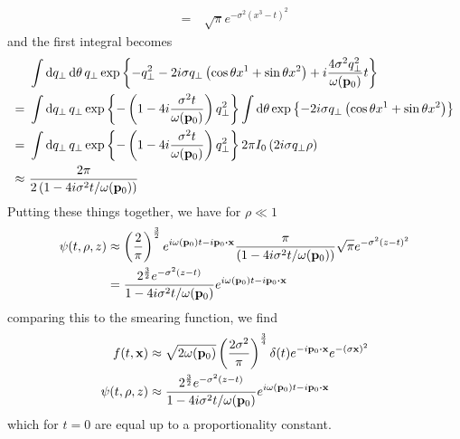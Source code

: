 \begin{example}
\begin{equation*}
\begin{split}
			\\
			=&\
			\sqrt{\pi}
			e^{-\sigma^2(x^3-t)^2}
		\end{split}
	\end{equation*}
	and the first integral becomes
	\begin{equation*}
		\begin{split}
			&\
			\int\dd{q_\perp}\dd{\theta} q_\perp
			\exp\left\{
				-
				q_\perp^2
				-
				2i\sigma
				q_\perp
				\left(
					\cos\theta
					x^1
					+
					\sin\theta
					x^2
				\right)
				+
				i\frac{4\sigma^2 q_\perp^2}{\omega(\vb{p}_0)}t
			\right\}
			\\
			=&\
			\int\dd{q_\perp}q_\perp
			\exp\left\{
				-
				\left(
					1
					-
					4i\frac{\sigma^2t}{\omega(\vb{p}_0)}
				\right)
				q_\perp^2
			\right\}
			\int\dd{\theta}
			\exp\left\{
				-
				2i\sigma
				q_\perp
				\left(
					\cos\theta
					x^1
					+
					\sin\theta
					x^2
				\right)
			\right\}
			\\
			=&\
			\int\dd{q_\perp}q_\perp
			\exp\left\{
				-
				\left(
					1
					-
					4i\frac{\sigma^2t}{\omega(\vb{p}_0)}
				\right)
				q_\perp^2
			\right\}
			2\pi
			I_0\left(2i\sigma q_\perp\rho\right)
			\\
			\approx &\
			\frac{2\pi}{2\left(1-4i\sigma^2 t/\omega(\vb{p}_0)\right)}
		\end{split}
	\end{equation*}
	Putting these things together, we have for $\rho\ll1$
	\begin{equation*}
		\begin{split}
			\psi(t,\rho,z)
			&\approx
			\left(\frac{2}{\pi}\right)^\frac{3}{2}
			e^{i\omega(\vb{p}_0)t-i\vb{p}_0\vdot\vb{x}}
			\frac{\pi}{\left(1-4i\sigma^2 t/\omega(\vb{p}_0)\right)}
			\sqrt{\pi}
			e^{-\sigma^2(z-t)^2}
			\\
			&=
			\frac{2^\frac{3}{2}e^{-\sigma^2(z-t)}}{1-4i\sigma^2 t/\omega(\vb{p}_0)}
			e^{i\omega(\vb{p}_0)t-i\vb{p}_0\vdot\vb{x}}
		\end{split}
	\end{equation*}
	comparing this to the smearing function, we find
	\begin{align*}
		f(t,\vb{x})
		&\approx
		\sqrt{2\omega(\vb{p}_0)}
		\left(\frac{2\sigma^2}{\pi}\right)^{\frac{3}{4}}
		\delta(t)
		e^{-i\vb{p}_0\vdot\vb{x}}
		e^{-(\sigma\vb{x})^2}
		\\
		\psi(t,\rho,z)
		&\approx
		\frac{2^\frac{3}{2}e^{-\sigma^2(z-t)}}{1-4i\sigma^2 t/\omega(\vb{p}_0)}
		e^{i\omega(\vb{p}_0)t-i\vb{p}_0\vdot\vb{x}}
	\end{align*}
	which for $t=0$ are equal up to a proportionality constant.
\end{example}
